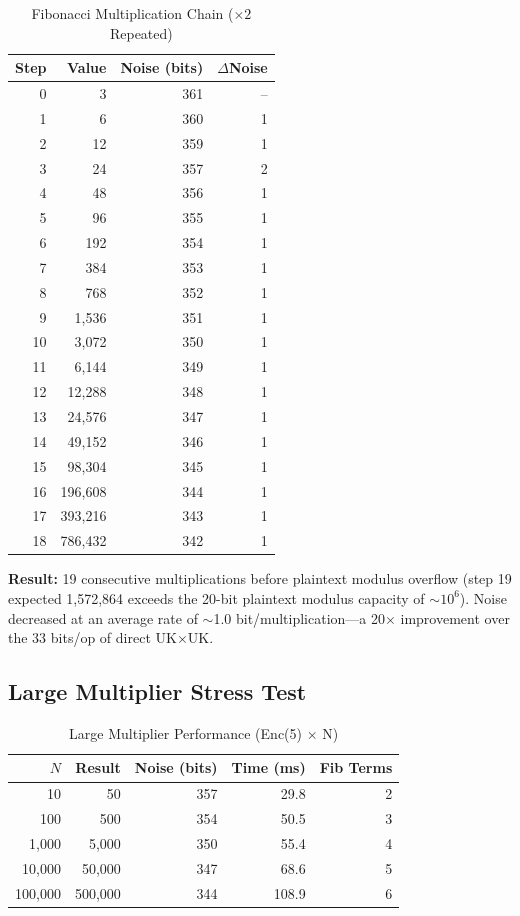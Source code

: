 \documentclass[11pt]{article}
\begin{document}
\begin{table}[h]
\centering
\caption{Fibonacci Multiplication Chain ($\times 2$ Repeated)}
\begin{tabular}{r|r|r|r}
\textbf{Step} & \textbf{Value} & \textbf{Noise (bits)} & \textbf{$\Delta$Noise} \\
\hline
0 & 3 & 361 & -- \\
1 & 6 & 360 & 1 \\
2 & 12 & 359 & 1 \\
3 & 24 & 357 & 2 \\
4 & 48 & 356 & 1 \\
5 & 96 & 355 & 1 \\
6 & 192 & 354 & 1 \\
7 & 384 & 353 & 1 \\
8 & 768 & 352 & 1 \\
9 & 1,536 & 351 & 1 \\
10 & 3,072 & 350 & 1 \\
11 & 6,144 & 349 & 1 \\
12 & 12,288 & 348 & 1 \\
13 & 24,576 & 347 & 1 \\
14 & 49,152 & 346 & 1 \\
15 & 98,304 & 345 & 1 \\
16 & 196,608 & 344 & 1 \\
17 & 393,216 & 343 & 1 \\
18 & 786,432 & 342 & 1
\end{tabular}
\end{table}

\textbf{Result:} 19 consecutive multiplications before plaintext modulus overflow (step 19 expected 1,572,864 exceeds the 20-bit plaintext modulus capacity of $\sim 10^6$). Noise decreased at an average rate of $\sim$1.0 bit/multiplication—a 20$\times$ improvement over the 33 bits/op of direct UK$\times$UK.

\subsection{Large Multiplier Stress Test}

\begin{table}[h]
\centering
\caption{Large Multiplier Performance (Enc(5) $\times$ N)}
\begin{tabular}{r|r|r|r|r}
\textbf{$N$} & \textbf{Result} & \textbf{Noise (bits)} & \textbf{Time (ms)} & \textbf{Fib Terms} \\
\hline
10 & 50 & 357 & 29.8 & 2 \\
100 & 500 & 354 & 50.5 & 3 \\
1,000 & 5,000 & 350 & 55.4 & 4 \\
10,000 & 50,000 & 347 & 68.6 & 5 \\
100,000 & 500,000 & 344 & 108.9 & 6
\end{tabular}
\end{table}
\end{document}
